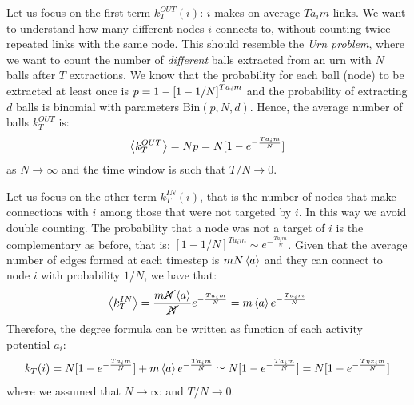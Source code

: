 \documentclass[../main/main.tex]{subfiles}
\begin{document}
Let us focus on the first term \( k_T^{OUT} (i) \): $i$ makes on average $T a_i m$ links.
We want to understand how many different nodes $i$ connects to, without counting twice repeated links with the same node. This should resemble the \textit{Urn problem}, where we want to count the number of \textit{different} balls extracted from an urn with $N$ balls after $T$ extractions.
We know that the probability for each ball (node) to be extracted at least once is $p = 1 - \qty[ 1 - 1/N ]^{T a_i m}$ and the probability of extracting $d$ balls is binomial with parameters $\text{Bin}(p, N, d)$. Hence, the average number of balls $k_T^{OUT}$ is:
\begin{equation}
    \expval{ k_T^{OUT} } = Np = N [1-e^{-\frac{T a_i m}{N}} ]
\end{equation}
as $N \to \infty$ and the time window is such that $T/N \to 0$.


Let us focus on the other term $k_T^{IN}(i)$, that is the number of nodes that make connections with $i$ among those that were not targeted by $i$. In this way we avoid double counting. The probability that a node was not a target of $i$ is the complementary as before, that is: $[1-1/N]^{T a_i m} \sim e^{-\frac{T a_i m}{N}}$. Given that the average number of edges formed at each timestep is $m N \expval{a}$ and they can connect to node $i$ with probability $1/N$, we have that:
\begin{equation}
    \expval{k_T^{IN}} = \frac{m \cancel{N}\expval{a}}{\cancel{N}} e^{-\frac{T a_i m}{N}} = m \expval{a} e^{-\frac{T a_i m}{N}}
\end{equation}
Therefore, the degree formula can be written as function of each activity potential $a_i$:
\begin{align}
    k_T(i) = N[1-e^{-\frac{T a_i m}{N}}]
    + m \expval{a} e^{-\frac{T a_i m}{N}}
    \simeq N[1-e^{-\frac{T a_i m}{N}}]
     = N[1-e^{-\frac{T \eta x_i m}{N}}]
\end{align}
where we assumed that $N \to \infty$ and $T/N \to 0$.
\end{document}
